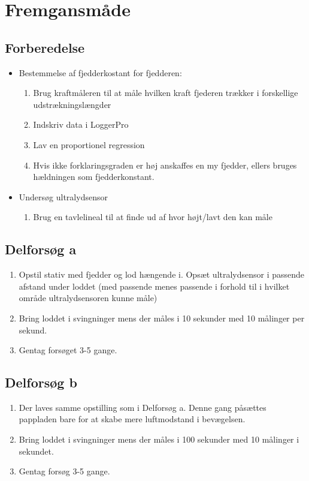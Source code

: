 \documentclass{article} %
\begin{document}
\section {Fremgansmåde}
\subsection{Forberedelse}
\begin{itemize}
	\item Bestemmelse af fjedderkostant for fjedderen:
		\begin{enumerate}
			\item Brug kraftmåleren til at måle hvilken kraft fjederen trækker i forskellige udstrækningslængder
			\item Indskriv data i LoggerPro
			\item Lav en proportionel regression
			\item Hvis ikke forklaringsgraden er høj anskaffes en my fjedder, ellers bruges hældningen som fjedderkonstant.
		\end{enumerate}
	\item Undersøg ultralydsensor
		\begin{enumerate}
			\item Brug en tavlelineal til at finde ud af hvor højt/lavt den kan måle
		\end{enumerate}
\end{itemize}
\subsection{Delforsøg a}
\begin{enumerate}
	\item Opstil stativ med fjedder og lod hængende i. Opsæt ultralydsensor i passende afstand under loddet (med passende menes passende i forhold til i hvilket område ultralydsensoren kunne måle)
	\item Bring loddet i svingninger mens der måles i 10 sekunder med 10 målinger per sekund.
	\item Gentag forsøget 3-5 gange.	
\end{enumerate}

\subsection{Delforsøg b}
\begin{enumerate}
	\item Der laves samme opstilling som i Delforsøg a. Denne gang påsættes pappladen bare for at skabe mere luftmodstand i bevægelsen.
	\item Bring loddet i svingninger mens der måles i 100 sekunder med 10 målinger i sekundet.
	\item Gentag forsøg 3-5 gange.
\end{enumerate}
\end{document}
